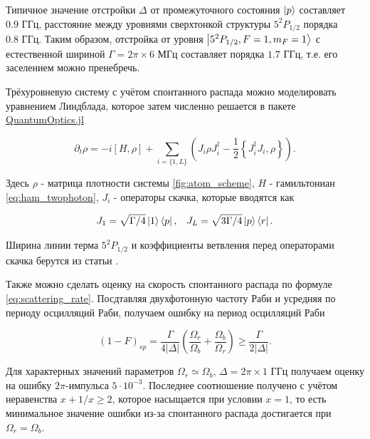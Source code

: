 Типичное значение отстройки $\Delta$ от промежуточного состояния $\left| p \right\rangle$ составляет $0.9 \text{ ГГц}$, расстояние между уровнями сверхтонкой структуры $5^2P_{1/2}$ порядка $0.8 \text{ ГГц}$. Таким образом, отстройка от уровня $\left| 5^2P_{1/2},F=1,m_F=1 \right\rangle$ с естественной шириной $\Gamma= 2\pi \times 6 \text{ МГц}$ составляет порядка $1.7 \text{ ГГц}$, т.е. его заселением можно пренебречь. 

Трёхуровневую систему с учётом спонтанного распада можно моделировать уравнением Линдблада, которое затем численно решается в пакете \href{https://www.qojulia.org/}{QuantumOptics.jl} \cite{kramer2018quantumoptics}

\begin{equation}
	\partial_t \rho = -i\left[H, \rho\right] + \sum_{i=\{1,L\}}\left(J_i \rho J_i^\dagger - \frac{1}{2}\left\{J_i^\dagger J_i, \rho\right\} \right).
\end{equation}

Здесь $\rho$ - матрица плотности системы \ref{fig:atom_scheme}, $H$ - гамильтониан \ref{eq:ham_twophoton}, $J_i$ - операторы скачка, которые вводятся как

\begin{equation}
	\begin{aligned}
		J_{1} = \sqrt{\Gamma/4}\left| 1 \right\rangle\left\langle p \right|, \;\;\; J_L = \sqrt{3\Gamma/4}\left| p \right\rangle\left\langle r \right|.
	\end{aligned}
\end{equation}

Ширина линии терма $5^2P_{1/2}$ и коэффициенты ветвления перед операторами скачка берутся из статьи \cite{Rb87}. 

Также можно сделать оценку на скорость спонтанного распада по формуле \ref{eq:scattering_rate}. Посдтавляя двухфотонную частоту Раби и усредняя по периоду осцилляций Раби, получаем ошибку на период осцилляций Раби 

\begin{equation}
	(1-F)_{sp} = \frac{\Gamma}{4|\Delta|}\left(\frac{\Omega_r}{\Omega_b} + \frac{\Omega_b}{\Omega_r}\right) \ge \frac{\Gamma}{2|\Delta|}.
\end{equation}

Для характерных значений параметров $\Omega_r \simeq \Omega_b$, $\Delta = 2\pi \times 1 \text{ ГГц}$ получаем оценку на ошибку $2\pi$-импульса $5\cdot 10^{-3}$. Последнее соотношение получено с учётом неравенства $x+1/x \ge 2$, которое насыщается при условии $x=1$, то есть минимальное значение ошибки из-за спонтанного распада достигается при $\Omega_r = \Omega_b$.


